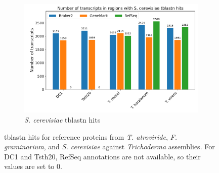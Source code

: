 \begin{figure}[htp]\ContinuedFloat
  \centering
  \begin{subfigure}[b]{0.85\textwidth}
    \includegraphics[width=\textwidth]{figures/blast-scerevisiae.pdf}
    \caption{\textit{S. cerevisiae} tblastn hits}\label{fig:blast-scerevisiae}
  \end{subfigure}
  \caption[Results from tblastn by reference]{tblastn hits for reference proteins from \textit{T. atroviride}, \textit{F. graminarium}, and \textit{S. cerevisiae} against \textit{Trichoderma} assemblies. For DC1 and Tsth20, RefSeq annotations are not available, so their values are set to 0.}\label{fig:blast-hits}
\end{figure}

